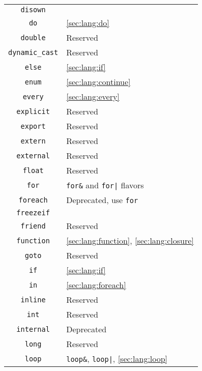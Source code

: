 \begin{tabular}{|c|l|}
  \lstinline"disown" &                                          \\
      \lstinline"do" & \autoref{sec:lang:do}                    \\
  \lstinline"double" & Reserved                                 \\
\lstinline"dynamic_cast" & Reserved                                 \\
    \lstinline"else" & \autoref{sec:lang:if}                    \\
    \lstinline"enum" & \autoref{sec:lang:continue}              \\
   \lstinline"every" & \autoref{sec:lang:every}                 \\
\lstinline"explicit" & Reserved                                 \\
  \lstinline"export" & Reserved                                 \\
  \lstinline"extern" & Reserved                                 \\
\lstinline"external" & Reserved                                 \\
   \lstinline"float" & Reserved                                 \\
     \lstinline"for" & \verb|for&| and \verb-for|- flavors      \\
 \lstinline"foreach" & Deprecated, use \verb|for|               \\
\lstinline"freezeif" &                                          \\
  \lstinline"friend" & Reserved                                 \\
\lstinline"function" & \autoref{sec:lang:function}, \autoref{sec:lang:closure} \\
    \lstinline"goto" & Reserved                                 \\
      \lstinline"if" & \autoref{sec:lang:if}                    \\
      \lstinline"in" & \autoref{sec:lang:foreach}               \\
  \lstinline"inline" & Reserved                                 \\
     \lstinline"int" & Reserved                                 \\
\lstinline"internal" & Deprecated                               \\
    \lstinline"long" & Reserved                                 \\
    \lstinline"loop" & \verb|loop&|, \verb-loop|-, \autoref{sec:lang:loop} \\

\end{tabular}
